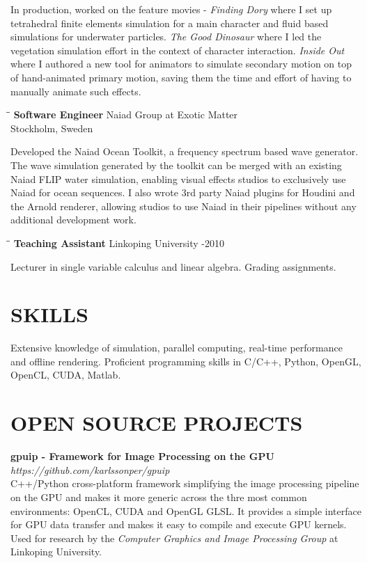 \documentclass{res}
\begin{document}
\begin{resume}
   In production, worked on the feature movies - \emph{Finding Dory} where I set up tetrahedral finite elements simulation for a main character and fluid based simulations for underwater particles. \emph{The Good Dinosaur} where I led the vegetation simulation effort in the context of character interaction. \emph{Inside Out} where I authored a new tool for animators to simulate secondary motion on top of hand-animated primary motion, saving them the time and effort of having to manually animate such effects.

   \begin{tabbing}
   \hspace{2.3in}\= \hspace{2.7in}\= \kill %
    {\bf Software Engineer} \>Naiad Group at Exotic Matter\\
                          \>Stockholm, Sweden
   \end{tabbing}\vspace{-20pt}
    Developed the Naiad Ocean Toolkit, a frequency spectrum based wave generator. The wave simulation generated by the toolkit can be merged with an existing Naiad FLIP water simulation, enabling visual effects studios to exclusively use Naiad for ocean sequences. I also wrote 3rd party Naiad plugins for Houdini and the Arnold renderer, allowing studios to use Naiad in their pipelines without any additional development work.
   \begin{tabbing}%
   \hspace{2.3in}\= \hspace{2.7in}\= \kill %
   {\bf Teaching Assistant}  \>Linkoping University -2010
   \end{tabbing}\vspace{-20pt}
    Lecturer in single variable calculus and linear algebra. Grading assignments.       


\section{SKILLS}
Extensive knowledge of simulation, parallel computing, real-time performance and offline rendering.
Proficient programming skills in C/C++, Python, OpenGL, OpenCL, CUDA, Matlab.
 
\section{OPEN SOURCE PROJECTS}
{\bf gpuip - Framework for Image Processing on the GPU}\\
\emph{ https://github.com/karlssonper/gpuip} \\
C++/Python cross-platform framework simplifying the image processing pipeline on the GPU and makes it more generic across the thre most common environments: OpenCL, CUDA and OpenGL GLSL. It provides a simple interface for GPU data transfer and makes it easy to compile and execute GPU kernels. Used for research by the \emph{Computer Graphics and Image Processing Group} at Linkoping University.


\end{resume}
\end{document}
